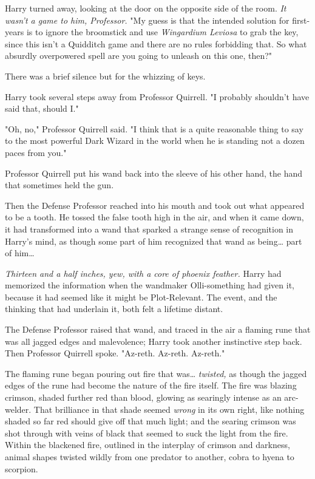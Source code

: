 Harry turned away, looking at the door on the opposite side of the room. 
\emph{It wasn't a game to him, Professor.} "My guess is that the intended 
solution for first-years is to ignore the broomstick and use \emph{Wingardium 
Leviosa} to grab the key, since this isn't a Quidditch game and there are no 
rules forbidding that. So what absurdly overpowered spell are you going to 
unleash on this one, then?"

There was a brief silence but for the whizzing of keys.

Harry took several steps away from Professor Quirrell. "I probably shouldn't 
have said that, should I."

"Oh, no," Professor Quirrell said. "I think that is a quite reasonable thing to 
say to the most powerful Dark Wizard in the world when he is standing not a 
dozen paces from you."

Professor Quirrell put his wand back into the sleeve of his other hand, the 
hand that sometimes held the gun.

Then the Defense Professor reached into his mouth and took out what appeared to 
be a tooth. He tossed the false tooth high in the air, and when it came down, 
it had transformed into a wand that sparked a strange sense of recognition in 
Harry's mind, as though some part of him recognized that wand as being{\ldots} 
part of him{\ldots}

\emph{Thirteen and a half inches, yew, with a core of phoenix feather.} Harry 
had memorized the information when the wandmaker Olli-something had given it, 
because it had seemed like it might be Plot-Relevant. The event, and the 
thinking that had underlain it, both felt a lifetime distant.

The Defense Professor raised that wand, and traced in the air a flaming rune 
that was all jagged edges and malevolence; Harry took another instinctive step 
back. Then Professor Quirrell spoke. "Az-reth. Az-reth. Az-reth."

The flaming rune began pouring out fire that was{\ldots} \emph{twisted,} as 
though the jagged edges of the rune had become the nature of the fire itself. 
The fire was blazing crimson, shaded further red than blood, glowing as 
searingly intense as an arc-welder. That brilliance in that shade seemed 
\emph{wrong} in its own right, like nothing shaded so far red should give off 
that much light; and the searing crimson was shot through with veins of black 
that seemed to suck the light from the fire. Within the blackened fire, 
outlined in the interplay of crimson and darkness, animal shapes twisted wildly 
from one predator to another, cobra to hyena to scorpion.

